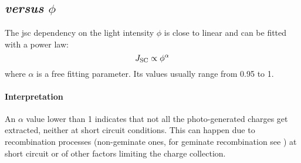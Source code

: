 	\subsection{ \textsl{versus} $\phi$}\label{jsc-phi}
		The \gls{jsc} dependency on the light intensity $\phi$ is close to linear and can be fitted with a power law:
		\begin{equation} \label{eq:jsc-phi}
			J_\mathrm{SC} \propto \phi^\alpha
		\end{equation}
		where $\alpha$ is a free fitting parameter. Its values usually range from 0.95 to 1.

		\paragraph{Interpretation}
		An $\alpha$ value lower than 1 indicates that not all the photo\hyp{}generated charges get extracted, neither at short circuit conditions.
		This can happen due to recombination processes (non-geminate ones, for geminate recombination see ) at short circuit \cite{Credgington2011} or of other factors limiting the charge collection.

